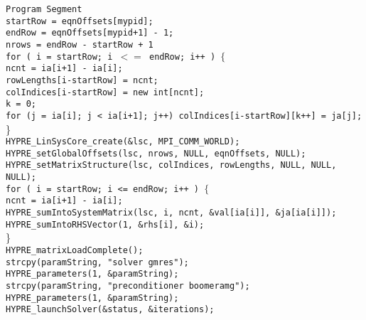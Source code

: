 \begin{tabbing}
\hspace{0.5in} \= {\tt Program Segment} \\[1mm]
\> {\tt startRow = eqnOffsets[mypid];} \\
\> {\tt endRow = eqnOffsets[mypid+1] - 1;} \\
\> {\tt nrows = endRow - startRow + 1} \\
\> {\tt for ( i = startRow; i $<=$ endRow; i++ ) $\{$ } \\
\> \hspace{0.3in} \= {\tt ncnt = ia[i+1] - ia[i];} \\
\> \> {\tt rowLengths[i-startRow] = ncnt;} \\
\> \> {\tt colIndices[i-startRow] = new int[ncnt];} \\
\> \> {\tt k = 0;} \\
\> \> {\tt for (j = ia[i]; j < ia[i+1]; j++) colIndices[i-startRow][k++] = ja[j];}\\
\> \} \\
\> {\tt HYPRE\_LinSysCore\_create(\&lsc, MPI\_COMM\_WORLD);} \\
\> {\tt HYPRE\_setGlobalOffsets(lsc, nrows, NULL, eqnOffsets, NULL);} \\
\> {\tt HYPRE\_setMatrixStructure(lsc, colIndices, rowLengths, NULL, NULL, NULL);} \\
\> {\tt for ( i = startRow; i <= endRow; i++ ) $\{$ } \\
\> \> {\tt ncnt = ia[i+1] - ia[i];} \\
\> \> {\tt HYPRE\_sumIntoSystemMatrix(lsc, i, ncnt, \&val[ia[i]], \&ja[ia[i]]);}\\
\> \> {\tt HYPRE\_sumIntoRHSVector(1, \&rhs[i], \&i);} \\
\> \} \\
\> {\tt HYPRE\_matrixLoadComplete();}\\
\> {\tt strcpy(paramString, "solver gmres");} \\
\> {\tt HYPRE\_parameters(1, \&paramString);} \\
\> {\tt strcpy(paramString, "preconditioner boomeramg");} \\
\> {\tt HYPRE\_parameters(1, \&paramString);} \\
\> {\tt HYPRE\_launchSolver(\&status, \&iterations);}
\end{tabbing}

